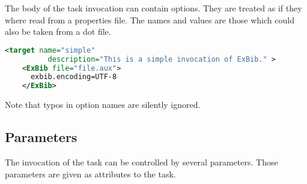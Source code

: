 The body of the task invocation can contain options. They are treated
as if they where read from a properties file. The names and values are
those which could also be taken from a dot file.

\begin{lstlisting}[language=XML,morekeywords={target}]
  <target name="simple"
          description="This is a simple invocation of ExBib." >
    <ExBib file="file.aux">
      exbib.encoding=UTF-8
    </ExBib>
\end{lstlisting}

Note that typos in option names are silently ignored.

\subsection{Parameters}

The invocation of the task can be controlled by several parameters.
Those parameters are given as attributes to the task. 


